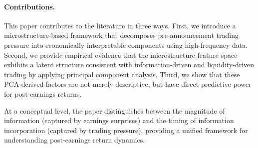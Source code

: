 \paragraph{Contributions.}
This paper contributes to the literature in three ways. First, we introduce a microstructure-based framework that decomposes pre-announcement trading pressure into economically interpretable components using high-frequency data. Second, we provide empirical evidence that the microstructure feature space exhibits a latent structure consistent with information-driven and liquidity-driven trading by applying principal component analysis. Third, we show that these PCA-derived factors are not merely descriptive, but have direct predictive power for post-earnings returns.

At a conceptual level, the paper distinguishes between the magnitude of information (captured by earnings surprises) and the timing of information incorporation (captured by trading pressure), providing a unified framework for understanding post-earnings return dynamics.
